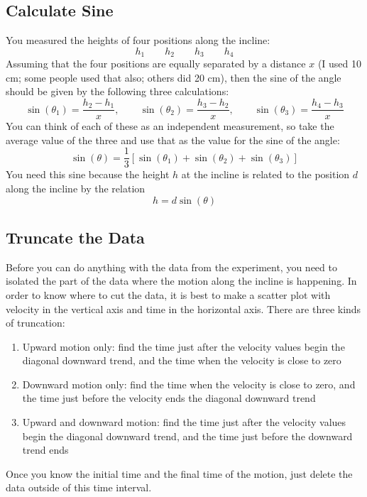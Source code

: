 \subsection{Calculate Sine}
You measured the heights of four positions along the incline:
\begin{equation}
    h_{1} \qquad h_{2} \qquad h_{3} \qquad h_{4}
\end{equation}
Assuming that the four positions are equally separated by a distance $x$ (I used 10 cm; some people used that also; others did 20 cm), then the sine of the angle should be given by the following three calculations:
\begin{equation}
    \sin{(\theta_{1})} = \frac{h_{2} - h_{1}}{x}, \qquad \sin{(\theta_{2})} = \frac{h_{3} - h_{2}}{x}, \qquad \sin{(\theta_{3})} = \frac{h_{4} - h_{3}}{x}
\end{equation}
You can think of each of these as an independent measurement, so take the average value of the three and use that as the value for the sine of the angle:
\begin{equation}
    \sin{(\theta)} = \frac{1}{3} \left[ \sin{(\theta_{1})} + \sin{(\theta_{2})} + \sin{(\theta_{3})} \right]
\end{equation}
You need this sine because the height $h$ at the incline is related to the position $d$ along the incline by the relation
\begin{equation}
    h = d \sin(\theta)
\end{equation}
\subsection{Truncate the Data}
Before you can do anything with the data from the experiment, you need to isolated the part of the data where the motion along the incline is happening. In order to know where to cut the data, it is best to make a scatter plot with velocity in the vertical axis and time in the horizontal axis. There are three kinds of truncation:
\begin{enumerate}
    \item Upward motion only: find the time just after the velocity values begin the diagonal downward trend, and the time when the velocity is close to zero
    \item Downward motion only: find the time when the velocity is close to zero, and the time just before the velocity ends the diagonal downward trend
    \item Upward and downward motion: find the time just after the velocity values begin the diagonal downward trend, and the time just before the downward trend ends
\end{enumerate}
Once you know the initial time and the final time of the motion, just delete the data outside of this time interval.
